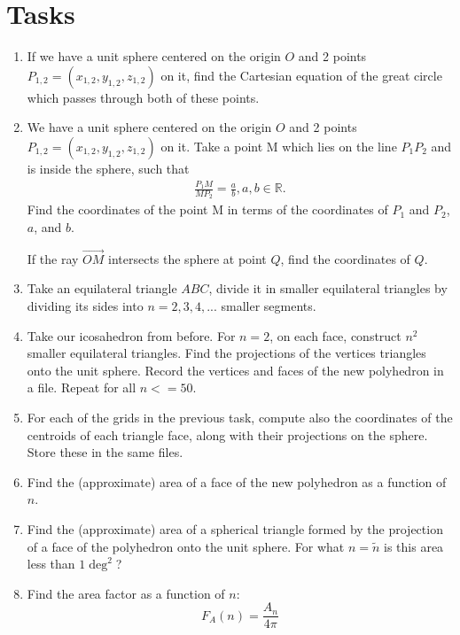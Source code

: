 \documentclass[author-year, prd, amsmath, amssymb, longbibliography, floatfix, reprint, superscriptaddress, a4]{revtex4-1}
\begin{document}
\section{Tasks}
\begin{enumerate}
\item If we have a unit sphere centered on the origin \(O\) and 2 points \(P_{1,2} = (x_{1,2}, y_{1,2}, z_{1,2})\) on it, find the
Cartesian equation of the great circle which passes through both of these points.

\item We have a unit sphere centered on the origin \(O\) and 2 points \(P_{1,2} = (x_{1,2}, y_{1,2}, z_{1,2})\) on it. Take a point {M}
which lies on the line \(P_{1} P_{2}\) and is inside the sphere, such that
\begin{align}
    \frac{P_{1} M}{M P_{2}} = \frac{a}{b}, a, b \in \mathbb{R}.
\end{align}
Find the coordinates of the point {M} in terms of the coordinates of \(P_{1}\) and \(P_{2}\), \(a\), and \(b\).

If the ray \(\vec{OM}\) intersects the sphere at point \(Q\), find the coordinates of \(Q\).

\item Take an equilateral triangle \(ABC\), divide it in smaller equilateral triangles by dividing its sides into \(n = 2, 3, 4, ...\) smaller segments.

\item Take our icosahedron from before. For \(n = 2\), on each face, construct \(n^{2}\) smaller equilateral triangles. Find the projections of the vertices triangles onto the unit sphere. Record the vertices and faces of the new polyhedron in a file. Repeat for all \(n <= 50\).

\item For each of the grids in the previous task, compute also the coordinates of the centroids of each triangle face, along with their projections on the sphere. Store these in the same files.

\item Find the (approximate) area of a face of the new polyhedron as a function of \(n\).

\item Find the (approximate) area of a spherical triangle formed by the projection of a face of the polyhedron onto the unit sphere. For what \(n = \tilde{n}\) is this area less than \(1 \deg^{2}\)?

\item Find the area factor as a function of \(n\):
$$F_{A}(n) = \frac{A_{n}}{4 \pi}$$


\end{enumerate}
\end{document}
